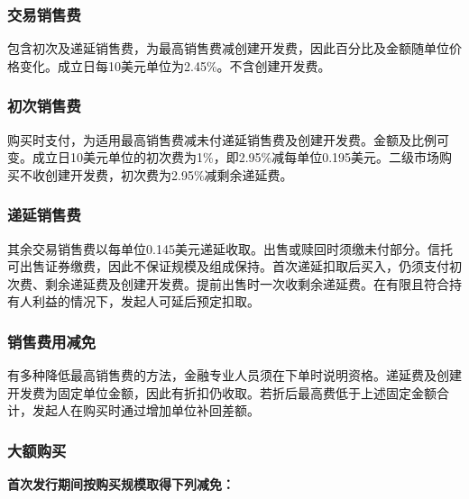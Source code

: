 \documentclass[UTF8,fontset=none,11pt,a4paper]{ctexart}
\begin{document}
\subsubsection*{交易销售费}
包含初次及递延销售费，为最高销售费减创建开发费，因此百分比及金额随单位价格变化。成立日每10美元单位为2.45\%。不含创\allowbreak\mbox{建开发费。}


\subsubsection*{初次销售费}
购买时支付，为适用最高销售费减未付递延销售费及创建开发费。金额及比例可变。成立日10美元单位的初次费为1\%，即2.95\%减每单位0.195美元。二级市场购买不收创建开发费，初次费为2.95\%减剩\allowbreak\mbox{余递延费。}


\subsubsection*{递延销售费}
其余交易销售费以每单位0.145美元递延收取。出售或赎回时须缴未付部分。信托可出售证券缴费，因此不保证规模及组成保持。首次递延扣取后买入，仍须支付初次费、剩余递延费及创建开发费。提前出售时一次收剩余递延费。在有限且符合持有人利益的情况下，发起人可延后\allowbreak\mbox{预定扣取。}


\subsubsection*{销售费用减免}
有多种降低最高销售费的方法，金融专业人员须在下单时说明资格。递延费及创建开发费为固定单位金额，因此有折扣仍收取。若折后最高费低于上述固定金额合计，发起人在购买时通过增加单位\allowbreak\mbox{补回差额。}


\subsubsection*{大额购买}
\textbf{首次发行期间按购买规模取得下列减免：}
\end{document}
